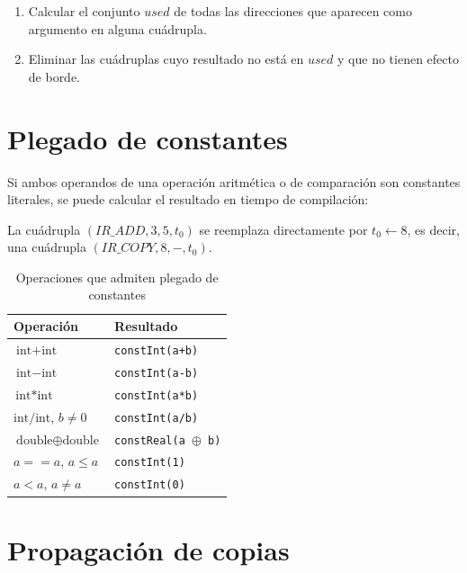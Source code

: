 \begin{enumerate}
  \item Calcular el conjunto $\textit{used}$ de todas las direcciones que
    aparecen como argumento en alguna cuádrupla.
  \item Eliminar las cuádruplas cuyo resultado no está en $\textit{used}$
    y que no tienen efecto de borde.
\end{enumerate}

\section{Plegado de constantes}

Si ambos operandos de una operación aritmética o de comparación son constantes
literales, se puede calcular el resultado en tiempo de compilación:

\begin{ejemplo}
  La cuádrupla $(IR\_ADD, 3, 5, t_0)$ se reemplaza directamente por
  $t_0 \leftarrow 8$, es decir, una cuádrupla $(IR\_COPY, 8, -, t_0)$.
\end{ejemplo}

\begin{table}[H]
  \centering
  \caption{Operaciones que admiten plegado de constantes}
  \label{tab:folding}
  \begin{tabular}{ll}
    \toprule
    \textbf{Operación} & \textbf{Resultado} \\
    \midrule
    $\text{int} + \text{int}$   & \texttt{constInt(a+b)} \\
    $\text{int} - \text{int}$   & \texttt{constInt(a-b)} \\
    $\text{int} * \text{int}$   & \texttt{constInt(a*b)} \\
    $\text{int} / \text{int}$, $b \neq 0$ & \texttt{constInt(a/b)} \\
    $\text{double} \oplus \text{double}$ & \texttt{constReal(a $\oplus$ b)} \\
    $a == a$, $a \leq a$        & \texttt{constInt(1)} \\
    $a < a$, $a \neq a$         & \texttt{constInt(0)} \\
    \bottomrule
  \end{tabular}
\end{table}

\section{Propagación de copias}

